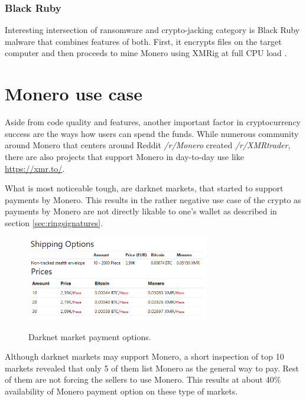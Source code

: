 \documentclass[
  printed, %
  table,   %
  lof,     %
  lot,     %
           oneside, color
]{fithesis3}
\begin{document}
\subsubsection{Black Ruby}
Interesting intersection of ransomware and crypto-jacking category is Black Ruby malware that combines features of both. First, it encrypts files on the target computer and then proceeds to mine Monero using XMRig at full CPU load \cite{blackruby2018}.

\vspace{-1em}
\section{Monero use case}
Aside from code quality and features, another important factor in cryptocurrency success are the ways how users can spend the funds. While numerous community around Monero that centers around Reddit \textit{/r/Monero} created \textit{/r/XMRtrader}, there are also projects that support Monero in day-to-day use like \url{https://xmr.to/}.

What is most noticeable tough, are darknet markets, that started to support payments by Monero. This results in the rather negative use case of the crypto as payments by Monero are not directly likable to one's wallet as described in section \ref{sec:ringsignatures}.

\begin{figure}[H]
\begin{center}

    \vspace{-0.8em}
 \includegraphics[trim={0 1.8cm 0 0},clip,width=0.71\textwidth]{Screenshot_360.png}
    \caption{Darknet market payment options.}
    \vspace{-1.5em}
    \label{pic:withoutresdrawable}
\end{center}
    \end{figure}


Although darknet markets may support Monero, a short inspection of top 10 markets revealed that only 5 of them list Monero as the general way to pay. Rest of them are not forcing the sellers to use Monero. This results at about 40\% availability of Monero payment option on these type of markets.
\end{document}
